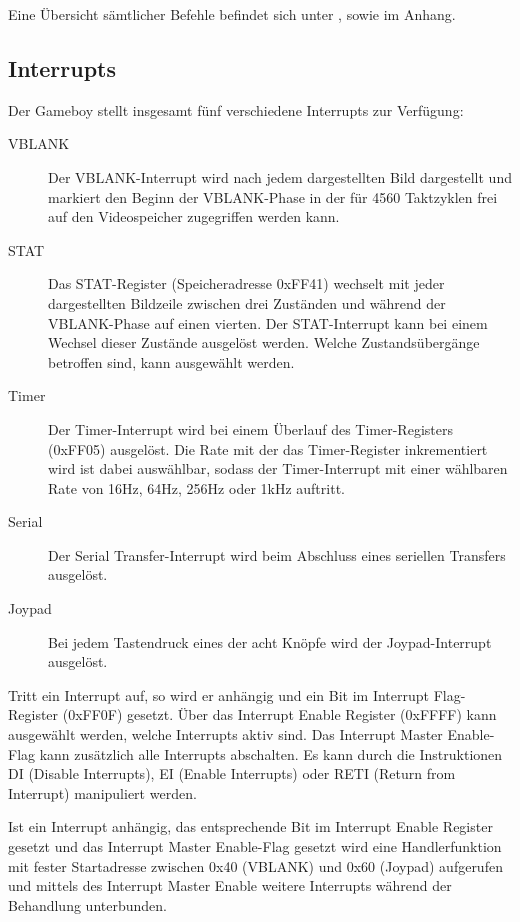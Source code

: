 \documentclass[a4paper]{scrartcl}
\begin{document}
Eine Übersicht sämtlicher Befehle befindet sich unter \cite{gameboy_opcodes}, sowie im Anhang.

\subsection{Interrupts}

Der Gameboy stellt insgesamt fünf verschiedene Interrupts zur Verfügung:

\begin{description}
\item[VBLANK]
Der VBLANK-Interrupt wird nach jedem dargestellten Bild dargestellt und markiert den Beginn der VBLANK-Phase in der für 4560 Taktzyklen frei auf den Videospeicher zugegriffen werden kann.
\item[STAT]
Das STAT-Register (Speicheradresse 0xFF41) wechselt mit jeder dargestellten Bildzeile zwischen drei Zuständen und während der VBLANK-Phase auf einen vierten. Der STAT-Interrupt kann bei einem Wechsel dieser Zustände ausgelöst werden. Welche Zustandsübergänge betroffen sind, kann ausgewählt werden.
\item[Timer]
Der Timer-Interrupt wird bei einem Überlauf des Timer-Registers (0xFF05) ausgelöst. Die Rate mit der das Timer-Register inkrementiert wird ist dabei auswählbar, sodass der Timer-Interrupt mit einer wählbaren Rate von 16Hz, 64Hz, 256Hz oder 1kHz auftritt.
\item[Serial]
Der Serial Transfer-Interrupt wird beim Abschluss eines seriellen Transfers ausgelöst.
\item[Joypad]
Bei jedem Tastendruck eines der acht Knöpfe wird der Joypad-Interrupt ausgelöst.
\end{description}

Tritt ein Interrupt auf, so wird er anhängig und ein Bit im Interrupt Flag-Register (0xFF0F) gesetzt.
Über das Interrupt Enable Register (0xFFFF) kann ausgewählt werden, welche Interrupts aktiv sind.
Das Interrupt Master Enable-Flag kann zusätzlich alle Interrupts abschalten. Es kann durch die Instruktionen DI (Disable Interrupts), EI (Enable Interrupts) oder RETI (Return from Interrupt) manipuliert werden.

Ist ein Interrupt anhängig, das entsprechende Bit im Interrupt Enable Register gesetzt und das Interrupt Master Enable-Flag gesetzt wird eine Handlerfunktion mit fester Startadresse zwischen 0x40 (VBLANK) und 0x60 (Joypad) aufgerufen und mittels des Interrupt Master Enable weitere Interrupts während der Behandlung unterbunden.
\end{document}
